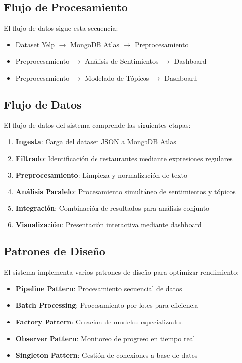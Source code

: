 \documentclass[12pt,a4paper,twoside,openany]{book}
\begin{document}
\subsection{Flujo de Procesamiento}

El flujo de datos sigue esta secuencia:
\begin{itemize}
    \item Dataset Yelp $\rightarrow$ MongoDB Atlas $\rightarrow$ Preprocesamiento
    \item Preprocesamiento $\rightarrow$ Análisis de Sentimientos $\rightarrow$ Dashboard
    \item Preprocesamiento $\rightarrow$ Modelado de Tópicos $\rightarrow$ Dashboard
\end{itemize}

\subsection{Flujo de Datos}

El flujo de datos del sistema comprende las siguientes etapas:

\begin{enumerate}
    \item \textbf{Ingesta}: Carga del dataset JSON a MongoDB Atlas
    \item \textbf{Filtrado}: Identificación de restaurantes mediante expresiones regulares
    \item \textbf{Preprocesamiento}: Limpieza y normalización de texto
    \item \textbf{Análisis Paralelo}: Procesamiento simultáneo de sentimientos y tópicos
    \item \textbf{Integración}: Combinación de resultados para análisis conjunto
    \item \textbf{Visualización}: Presentación interactiva mediante dashboard
\end{enumerate}

\subsection{Patrones de Diseño}

El sistema implementa varios patrones de diseño para optimizar rendimiento:

\begin{itemize}
    \item \textbf{Pipeline Pattern}: Procesamiento secuencial de datos
    \item \textbf{Batch Processing}: Procesamiento por lotes para eficiencia
    \item \textbf{Factory Pattern}: Creación de modelos especializados
    \item \textbf{Observer Pattern}: Monitoreo de progreso en tiempo real
    \item \textbf{Singleton Pattern}: Gestión de conexiones a base de datos
\end{itemize}
\end{document}
